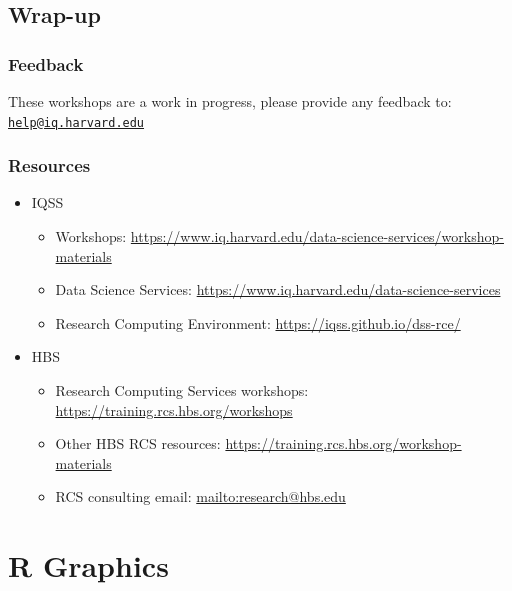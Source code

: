 \documentclass[
]{book}
\providecommand{\tightlist}{%
  \setlength{\itemsep}{0pt}\setlength{\parskip}{0pt}}
\begin{document}
\hypertarget{wrap-up-2}{%
\section{Wrap-up}\label{wrap-up-2}}

\hypertarget{feedback-2}{%
\subsection{Feedback}\label{feedback-2}}

These workshops are a work in progress, please provide any feedback to: \href{mailto:help@iq.harvard.edu}{\nolinkurl{help@iq.harvard.edu}}

\hypertarget{resources-3}{%
\subsection{Resources}\label{resources-3}}

\begin{itemize}
\tightlist
\item
  IQSS

  \begin{itemize}
  \tightlist
  \item
    Workshops: \url{https://www.iq.harvard.edu/data-science-services/workshop-materials}
  \item
    Data Science Services: \url{https://www.iq.harvard.edu/data-science-services}
  \item
    Research Computing Environment: \url{https://iqss.github.io/dss-rce/}
  \end{itemize}
\item
  HBS

  \begin{itemize}
  \tightlist
  \item
    Research Computing Services workshops: \url{https://training.rcs.hbs.org/workshops}
  \item
    Other HBS RCS resources: \url{https://training.rcs.hbs.org/workshop-materials}
  \item
    RCS consulting email: \url{mailto:research@hbs.edu}
  \end{itemize}
\end{itemize}

\hypertarget{r-graphics}{%
\chapter{R Graphics}\label{r-graphics}}
\end{document}
